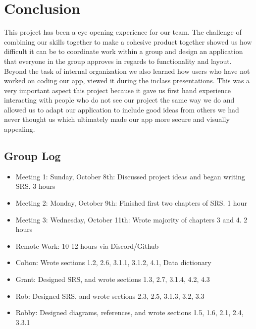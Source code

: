 \documentclass[11pt]{report}
\begin{document}


\chapter{Conclusion}
This project has been a eye opening experience for our team. The challenge of combining our skills together to make a cohesive product together showed us how difficult it can be to coordinate work within a group and design an application that everyone in the group approves in regards to functionality and layout. Beyond the task of internal organization we also learned how users who have not worked on coding our app, viewed it during the inclass presentations. This was a very important aspect this project because it gave us first hand experience interacting with people who do not see our project the same way we do and allowed us to adapt our application to include good ideas from others we had never thought us which ultimately made our app more secure and visually appealing.



\begin{appendices}

    \chapter{Group Log}
    \begin{itemize}
        \item Meeting 1: Sunday, October 8th: Discussed project ideas and began writing SRS. 3 hours
        \item Meeting 2: Monday, October 9th: Finished first two chapters of SRS. 1 hour
        \item Meeting 3: Wednesday, October 11th: Wrote majority of chapters 3 and 4. 2 hours
        \item Remote Work: 10-12 hours via Discord/Github
        \item Colton: Wrote sections 1.2, 2.6, 3.1.1, 3.1.2, 4.1, Data dictionary
        \item Grant: Designed SRS, and wrote sections 1.3, 2.7, 3.1.4, 4.2, 4.3
        \item Rob: Designed SRS, and wrote sections 2.3, 2.5, 3.1.3, 3.2, 3.3
        \item Robby: Designed diagrams, references, and wrote sections 1.5, 1.6, 2.1, 2.4, 3.3.1
    \end{itemize}


\end{appendices}
\end{document}
